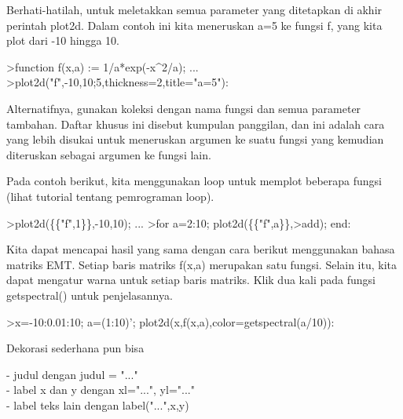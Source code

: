 \documentclass[a4paper,10pt]{article}
\begin{document}
\begin{eulernotebook}
\begin{eulercomment}
\begin{eulercomment}
\begin{eulercomment}
\begin{eulercomment}
\begin{eulercomment}
Berhati-hatilah, untuk meletakkan semua parameter yang ditetapkan di
akhir perintah plot2d. Dalam contoh ini kita meneruskan a=5 ke fungsi
f, yang kita plot dari -10 hingga 10.
\end{eulercomment}
\begin{eulerprompt}
>function f(x,a) := 1/a*exp(-x^2/a); ...
>plot2d("f",-10,10;5,thickness=2,title="a=5"):
\end{eulerprompt}
\begin{eulercomment}
Alternatifnya, gunakan koleksi dengan nama fungsi dan semua parameter
tambahan. Daftar khusus ini disebut kumpulan panggilan, dan ini adalah
cara yang lebih disukai untuk meneruskan argumen ke suatu fungsi yang
kemudian diteruskan sebagai argumen ke fungsi lain.

Pada contoh berikut, kita menggunakan loop untuk memplot beberapa
fungsi (lihat tutorial tentang pemrograman loop).
\end{eulercomment}
\begin{eulerprompt}
>plot2d(\{\{"f",1\}\},-10,10); ...
>for a=2:10; plot2d(\{\{"f",a\}\},>add); end:
\end{eulerprompt}
\begin{eulercomment}
Kita dapat mencapai hasil yang sama dengan cara berikut menggunakan
bahasa matriks EMT. Setiap baris matriks f(x,a) merupakan satu fungsi.
Selain itu, kita dapat mengatur warna untuk setiap baris matriks. Klik
dua kali pada fungsi getspectral() untuk penjelasannya.
\end{eulercomment}
\begin{eulerprompt}
>x=-10:0.01:10; a=(1:10)'; plot2d(x,f(x,a),color=getspectral(a/10)):
\end{eulerprompt}
\begin{eulercomment}
Dekorasi sederhana pun bisa

- judul dengan judul = "..."\\
- label x dan y dengan xl="...", yl="..."\\
- label teks lain dengan label("...",x,y)


\end{eulercomment}
\end{eulercomment}
\end{eulercomment}
\end{eulercomment}
\end{eulercomment}
\end{eulernotebook}
\end{document}
